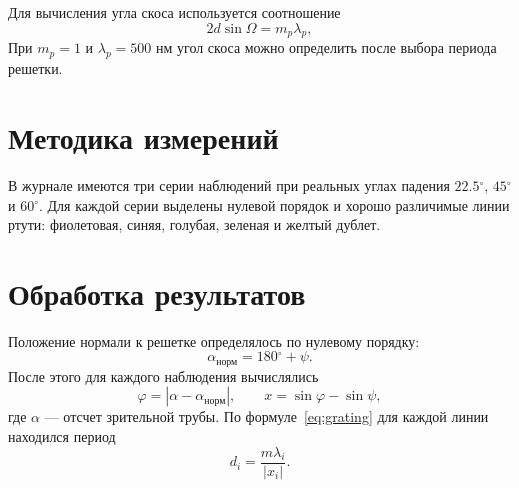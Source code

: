\documentclass[twoside]{mfitjournal}
\newcommand{\degree}{\ensuremath{^\circ}}
\begin{document}
Для вычисления угла скоса используется соотношение
\begin{equation}
2d\sin\Omega=m_p\lambda_p,
\label{eq:blaze}
\end{equation}
При $m_p=1$ и $\lambda_p=500$ нм угол скоса можно определить после выбора
периода решетки.

\section*{Методика измерений}
В журнале имеются три серии наблюдений при реальных углах падения $22.5\degree$, $45\degree$ и $60\degree$. Для каждой серии выделены нулевой порядок и хорошо различимые линии ртути: фиолетовая, синяя, голубая, зеленая и желтый дублет.

\section*{Обработка результатов}
Положение нормали к решетке определялось по нулевому порядку:
\[
\alpha_{\text{норм}} = 180\degree + \psi.
\]
После этого для каждого наблюдения вычислялись
\[
\varphi = \left| \alpha - \alpha_{\text{норм}} \right|,
\qquad
x=\sin\varphi-\sin\psi,
\]
где $\alpha$ --- отсчет зрительной трубы. По формуле~\eqref{eq:grating} для каждой линии находился период
\[
d_i=\frac{m\lambda_i}{|x_i|}.
\]
\end{document}
